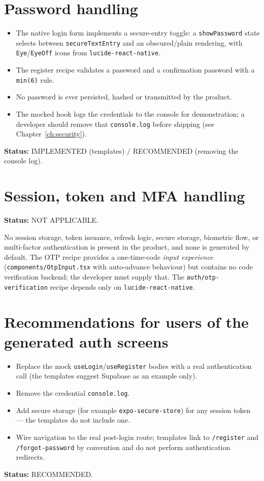 \section{Password handling}

\begin{itemize}
  \item The native login form implements a secure-entry toggle: a
        \texttt{showPassword} state selects between \texttt{secureTextEntry} and an
        obscured/plain rendering, with \texttt{Eye}/\texttt{EyeOff} icons from
        \texttt{lucide-react-native}.
  \item The register recipe validates a password and a confirmation password with a
        \texttt{min(6)} rule.
  \item No password is ever persisted, hashed or transmitted by the product.
  \item The mocked hook logs the credentials to the console for demonstration; a
        developer should remove that \texttt{console.log} before shipping (see
        Chapter~\ref{ch:security}).
\end{itemize}

\textbf{Status:} IMPLEMENTED (templates) / RECOMMENDED (removing the console log).

\section{Session, token and MFA handling}

\textbf{Status:} NOT APPLICABLE.

No session storage, token issuance, refresh logic, secure storage, biometric flow,
or multi-factor authentication is present in the product, and none is generated by
default. The OTP recipe provides a one-time-code \emph{input experience}
(\texttt{components/OtpInput.tsx} with auto-advance behaviour) but contains no code
verification backend; the developer must supply that. The
\texttt{auth/otp-verification} recipe depends only on
\texttt{lucide-react-native}.

\section{Recommendations for users of the generated auth screens}

\begin{itemize}
  \item Replace the mock \texttt{useLogin}/\texttt{useRegister} bodies with a real
        authentication call (the templates suggest Supabase as an example only).
  \item Remove the credential \texttt{console.log}.
  \item Add secure storage (for example \texttt{expo-secure-store}) for any
        session token --- the templates do not include one.
  \item Wire navigation to the real post-login route; templates link to
        \texttt{/register} and \texttt{/forgot-password} by convention and do not
        perform authentication redirects.
\end{itemize}

\textbf{Status:} RECOMMENDED.
